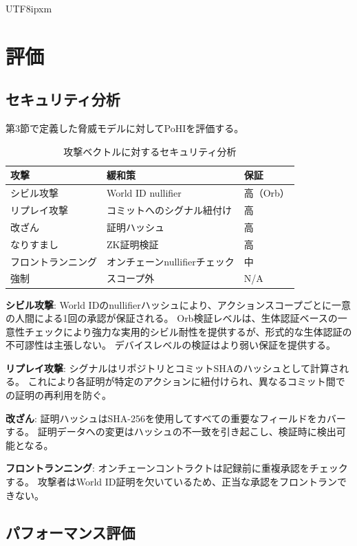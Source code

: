 \documentclass[a4paper,10pt]{article}
\begin{document}
\begin{CJK}{UTF8}{ipxm}
\section{評価}

\subsection{セキュリティ分析}

第3節で定義した脅威モデルに対してPoHIを評価する。

\begin{table}[h]
\centering
\caption{攻撃ベクトルに対するセキュリティ分析}
\begin{tabular}{lll}
\toprule
\textbf{攻撃} & \textbf{緩和策} & \textbf{保証} \\
\midrule
シビル攻撃 & World ID nullifier & 高（Orb） \\
リプレイ攻撃 & コミットへのシグナル紐付け & 高 \\
改ざん & 証明ハッシュ & 高 \\
なりすまし & ZK証明検証 & 高 \\
フロントランニング & オンチェーンnullifierチェック & 中 \\
強制 & スコープ外 & N/A \\
\bottomrule
\end{tabular}
\end{table}

\textbf{シビル攻撃}: World IDのnullifierハッシュにより、アクションスコープごとに一意の人間による1回の承認が保証される。
Orb検証レベルは、生体認証ベースの一意性チェックにより強力な実用的シビル耐性を提供するが、形式的な生体認証の不可謬性は主張しない。
デバイスレベルの検証はより弱い保証を提供する。

\textbf{リプレイ攻撃}: シグナルはリポジトリとコミットSHAのハッシュとして計算される。
これにより各証明が特定のアクションに紐付けられ、異なるコミット間での証明の再利用を防ぐ。

\textbf{改ざん}: 証明ハッシュはSHA-256を使用してすべての重要なフィールドをカバーする。
証明データへの変更はハッシュの不一致を引き起こし、検証時に検出可能となる。

\textbf{フロントランニング}: オンチェーンコントラクトは記録前に重複承認をチェックする。
攻撃者はWorld ID証明を欠いているため、正当な承認をフロントランできない。

\subsection{パフォーマンス評価}


\end{CJK}
\end{document}
